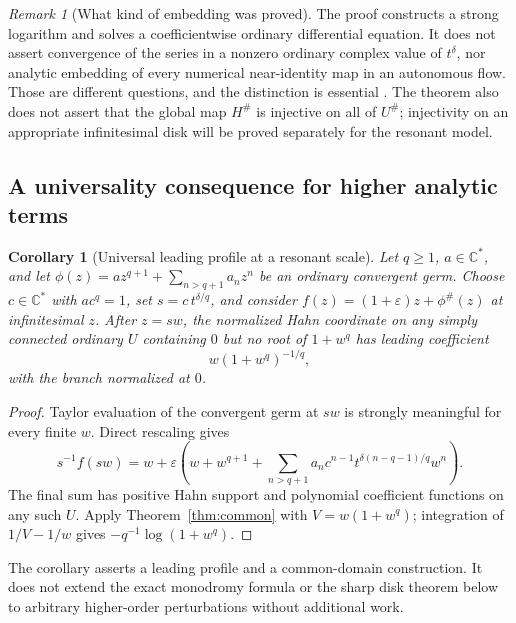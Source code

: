\documentclass[11pt,a4paper]{article}
\numberwithin{equation}{section}
\newtheorem{corollary}[theorem]{Corollary}
\theoremstyle{definition}
\theoremstyle{remark}
\newtheorem{remark}[theorem]{Remark}
\newcommand{\C}{\mathbb C}
\newcommand{\eps}{\varepsilon}
\begin{document}
\begin{remark}[What kind of embedding was proved]
The proof constructs a strong logarithm and solves a coefficientwise
ordinary differential equation.  It does not assert convergence of the
series in a nonzero ordinary complex value of $t^\delta$, nor analytic
embedding of every numerical near-identity map in an autonomous flow.
Those are different questions, and the distinction is essential
\cite{GV}.  The theorem also does not assert that the global map $H^\#$ is
injective on all of $U^\#$; injectivity on an appropriate infinitesimal disk
will be proved separately for the resonant model.
\end{remark}

\subsection{A universality consequence for higher analytic terms}

\begin{corollary}[Universal leading profile at a resonant scale]
\label{cor:universal}
Let $q\ge1$, $a\in\C^*$, and let
$\phi(z)=a z^{q+1}+\sum_{n>q+1}a_nz^n$ be an ordinary convergent germ.
Choose $c\in\C^*$ with $a c^q=1$, set $s=c\,t^{\delta/q}$, and consider
$f(z)=(1+\eps)z+\phi^\#(z)$ at infinitesimal $z$.
After $z=sw$, the normalized Hahn coordinate on any simply connected
ordinary $U$ containing $0$ but no root of $1+w^q$ has leading coefficient
\begin{equation}\label{eq:universalprofile}
 w(1+w^q)^{-1/q},
\end{equation}
with the branch normalized at $0$.
\end{corollary}

\begin{proof}
Taylor evaluation of the convergent germ at $sw$ is strongly meaningful
for every finite $w$.  Direct rescaling gives
\[
 s^{-1}f(sw)=w+\eps\left(w+w^{q+1}
   +\sum_{n>q+1} a_nc^{n-1}
       t^{\delta(n-q-1)/q}w^n\right).
\]
The final sum has positive Hahn support and polynomial coefficient
functions on any such $U$.  Apply Theorem~\ref{thm:common} with
$V=w(1+w^q)$; integration of $1/V-1/w$ gives
$-q^{-1}\log(1+w^q)$.
\end{proof}

The corollary asserts a leading profile and a common-domain construction.
It does not extend the exact monodromy formula or the sharp disk theorem
below to arbitrary higher-order perturbations without additional work.
\end{document}
